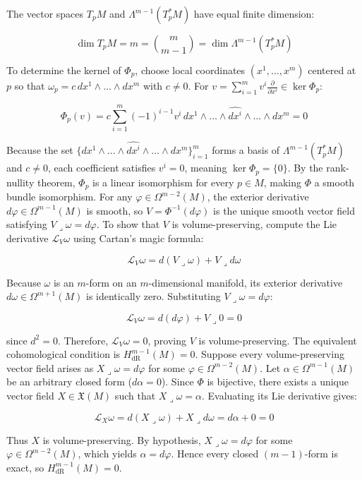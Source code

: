 \documentclass{article}
\begin{document}
	The vector spaces $T_p M$ and $\Lambda^{m-1}(T_p^* M)$ have equal finite dimension:
	
	
	$$\dim T_p M = m = \binom{m}{m-1} = \dim \Lambda^{m-1}(T_p^* M)$$
	
	To determine the kernel of $\Phi_p$, choose local coordinates $(x^1, \dots, x^m)$ centered at $p$ so that $\omega_p = c\, dx^1 \wedge \dots \wedge dx^m$ with $c \neq 0$. For $v = \sum_{i=1}^m v^i \frac{\partial}{\partial x^i} \in \ker \Phi_p$:
	
	
	$$\Phi_p(v) = c \sum_{i=1}^m (-1)^{i-1} v^i \, dx^1 \wedge \dots \wedge \widehat{dx^i} \wedge \dots \wedge dx^m = 0$$
	
	Because the set $\{dx^1 \wedge \dots \wedge \widehat{dx^i} \wedge \dots \wedge dx^m\}_{i=1}^m$ forms a basis of $\Lambda^{m-1}(T_p^* M)$ and $c \neq 0$, each coefficient satisfies $v^i = 0$, meaning $\ker \Phi_p = \{0\}$. By the rank-nullity theorem, $\Phi_p$ is a linear isomorphism for every $p \in M$, making $\Phi$ a smooth bundle isomorphism. For any $\varphi \in \Omega^{m-2}(M)$, the exterior derivative $d\varphi \in \Omega^{m-1}(M)$ is smooth, so $V = \Phi^{-1}(d\varphi)$ is the unique smooth vector field satisfying $V \lrcorner \omega = d\varphi$. To show that $V$ is volume-preserving, compute the Lie derivative $\mathcal{L}_V \omega$ using Cartan's magic formula:
	
	
	$$\mathcal{L}_V \omega = d(V \lrcorner \omega) + V \lrcorner d\omega$$
	
	Because $\omega$ is an $m$-form on an $m$-dimensional manifold, its exterior derivative $d\omega \in \Omega^{m+1}(M)$ is identically zero. Substituting $V \lrcorner \omega = d\varphi$:
	
	
	$$\mathcal{L}_V \omega = d(d\varphi) + V \lrcorner 0 = 0$$
	
	since $d^2 = 0$. Therefore, $\mathcal{L}_V \omega = 0$, proving $V$ is volume-preserving. The equivalent cohomological condition is $H^{m-1}_{\text{dR}}(M) = 0$. Suppose every volume-preserving vector field arises as $X \lrcorner \omega = d\varphi$ for some $\varphi \in \Omega^{m-2}(M)$. Let $\alpha \in \Omega^{m-1}(M)$ be an arbitrary closed form ($d\alpha = 0$). Since $\Phi$ is bijective, there exists a unique vector field $X \in \mathfrak{X}(M)$ such that $X \lrcorner \omega = \alpha$. Evaluating its Lie derivative gives:
	
	
	$$\mathcal{L}_X \omega = d(X \lrcorner \omega) + X \lrcorner d\omega = d\alpha + 0 = 0$$
	
	Thus $X$ is volume-preserving. By hypothesis, $X \lrcorner \omega = d\varphi$ for some $\varphi \in \Omega^{m-2}(M)$, which yields $\alpha = d\varphi$. Hence every closed $(m-1)$-form is exact, so $H^{m-1}_{\text{dR}}(M) = 0$.
	
\end{document}
